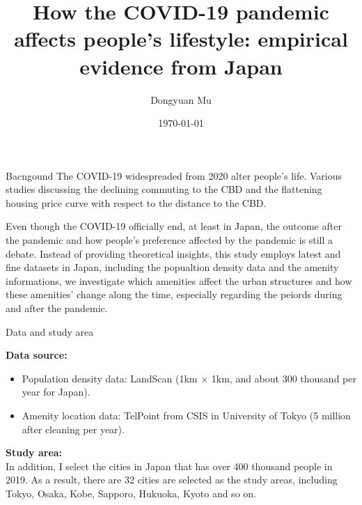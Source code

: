 \documentclass[aspectratio=169,xcolor=dvipsnames]{beamer}
\title[short title]{How the COVID-19 pandemic affects people's lifestyle: empirical evidence from Japan} %
\author[Pin-Yen] {Dongyuan Mu}
\institute[NTU] %
{
	Graduate School of Economics\\
	University of Tokyo 
}
\date{\today} %
\begin{document}
	\begin{frame}
		\maketitle
	\end{frame}
\begin{frame}{Bacngound}
		The COVID-19 widespreaded from 2020 alter people's life. Various studies discussing the declining commuting to the CBD and the flattening housing price curve with respect to the distance to the CBD.\par 
		Even though the COVID-19 officially end, at least in Japan, the outcome after the pandemic and how people's preference affected by the pandemic is still a debate. Instead of providing theoretical insights, this study employs latest and fine datasets in Japan, including the popualtion density data and the amenity informations, we investigate which amenities affect the urban structures and how these amenities' change along the time, especially regarding the peiords during and after the pandemic.
\end{frame}
\begin{frame}{Data and study area}
	
{\large \textbf{Data source:}}
\begin{itemize}
	\item Population density data: LandScan (1km $\times$ 1km, and about 300 thousand per year for Japan).
	\item Amenity location data: TelPoint from CSIS in University of Tokyo (5 million after cleaning per year). 
\end{itemize}\vspace{0.5em}
{\large \textbf{Study area:}}\\
In addition, I select the cities in Japan that has over 400 thousand people in 2019. As a result, there are 32 cities are selected as the study areas, including Tokyo, Osaka, Kobe, Sapporo, Hukuoka, Kyoto and so on.
\end{frame}
\end{document}
